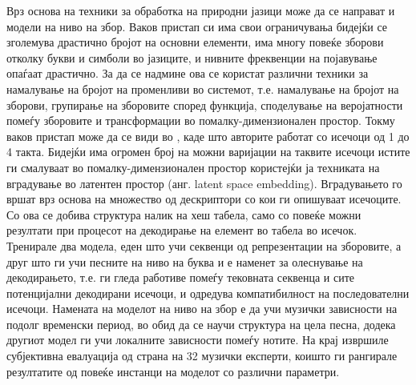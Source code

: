 Врз основа на техники за обработка на природни јазици може да се направат и модели на ниво на збор. Ваков пристап си има свои ограничувања бидејќи се зголемува драстично бројот на основни елементи, има многу повеќе зборови отколку букви и симболи во јазиците, и нивните фреквенции на појавување опаѓаат драстично. За да се надмине ова се користат различни техники за намалување на бројот на променливи во системот, т.е. намалување на бројот на зборови, групирање на зборовите според функција, споделување на веројатности помеѓу зборовите и трансформации во помалку-димензионален простор. Токму ваков пристап може да се види во \cite{Bretan2016}, каде што авторите работат со исечоци од 1 до 4 такта. Бидејќи има огромен број на можни варијации на таквите исечоци истите ги смалуваат во помалку-димензионален простор користејќи ја техниката на вградување во латентен простор (анг. latent space embedding). Вградувањето го вршат врз основа на множество од дескриптори со кои ги опишуваат исечоците. Со ова се добива структура налик на хеш табела, само со повеќе можни резултати при процесот на декодирање на елемент во табела во исечок. Тренирале два модела, еден што учи секвенци од репрезентации на зборовите, а друг што ги учи песните на ниво на буква и е наменет за олеснување на декодирањето, т.е. ги гледа работиве помеѓу тековната секвенца и сите потенцијални декодирани исечоци, и одредува компатибилност на последователни исечоци. Намената на моделот на ниво на збор е да учи музички зависности на подолг временски период, во обид да се научи структура на цела песна, додека другиот модел ги учи локалните зависности помеѓу нотите. На крај извршиле субјективна евалуација од страна на 32 музички експерти, коишто ги рангирале резултатите од повеќе инстанци на моделот со различни параметри.

